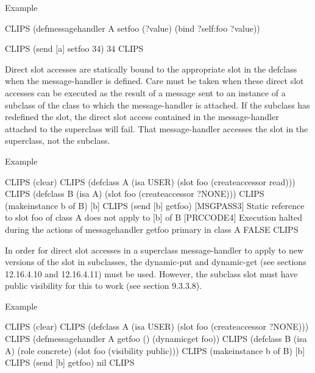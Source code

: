 \documentclass[letterpaper,10pt,english]{sphinxmanual}
\begin{document}
Example

\begin{sphinxVerbatim}[commandchars=\\\{\}]
CLIPS\PYGZgt{}
(defmessage\PYGZhy{}handler A set\PYGZhy{}foo (?value)
(bind ?self:foo ?value))

CLIPS\PYGZgt{} (send [a] set\PYGZhy{}foo 34)
34
CLIPS\PYGZgt{}
\end{sphinxVerbatim}

Direct slot accesses are statically bound to the appropriate slot in the
defclass when the message-handler is defined. Care must be taken when
these direct slot accesses can be executed as the result of a message
sent to an instance of a subclass of the class to which the
message-handler is attached. If the subclass has redefined the slot, the
direct slot access contained in the message-handler attached to the
superclass will fail. That message-handler accesses the slot in the
superclass, not the subclass.

Example

\begin{sphinxVerbatim}[commandchars=\\\{\}]
CLIPS\PYGZgt{} (clear)
CLIPS\PYGZgt{}
(defclass A (is\PYGZhy{}a USER)
  (slot foo (create\PYGZhy{}accessor read)))
CLIPS\PYGZgt{}
(defclass B (is\PYGZhy{}a A)
  (slot foo (create\PYGZhy{}accessor ?NONE)))
CLIPS\PYGZgt{} (make\PYGZhy{}instance b of B)
[b]
CLIPS\PYGZgt{} (send [b] get\PYGZhy{}foo)
[MSGPASS3] Static reference to slot foo of class A does not apply to [b]
of B
[PRCCODE4] Execution halted during the actions of message\PYGZhy{}handler
get\PYGZhy{}foo primary in class A
FALSE
CLIPS\PYGZgt{}
\end{sphinxVerbatim}

In order for direct slot accesses in a superclass message-handler to
apply to new versions of the slot in subclasses, the dynamic-put and
dynamic-get (see sections 12.16.4.10 and 12.16.4.11) must be used.
However, the subclass slot must have public visibility for this to work
(see section 9.3.3.8).

Example

\begin{sphinxVerbatim}[commandchars=\\\{\}]
CLIPS\PYGZgt{} (clear)
CLIPS\PYGZgt{}
(defclass A (is\PYGZhy{}a USER)
  (slot foo (create\PYGZhy{}accessor ?NONE)))
CLIPS\PYGZgt{}
(defmessage\PYGZhy{}handler A get\PYGZhy{}foo ()
  (dynamic\PYGZhy{}get foo))
CLIPS\PYGZgt{}
(defclass B (is\PYGZhy{}a A)
  (role concrete)
  (slot foo (visibility public)))
CLIPS\PYGZgt{} (make\PYGZhy{}instance b of B)
[b]
CLIPS\PYGZgt{} (send [b] get\PYGZhy{}foo)
nil
CLIPS\PYGZgt{}
\end{sphinxVerbatim}
\end{document}
